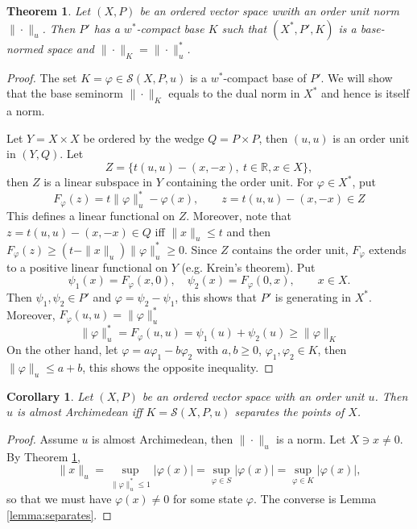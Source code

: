\documentclass[12pt]{article}
\newtheorem{thm}{Theorem}
\newtheorem{coro}{Corollary}
\theoremstyle{remark}
\newcommand{\<}{\langle}
\begin{document}
\begin{thm}\label{thm:ou_dual} Let $(X,P)$ be an ordered vector space wwith an order unit norm $\|\cdot\|_u$. Then 
$P'$  has a $w^*$-compact base $K$ such that  $(X^*,P',K)$ is a base-normed space and $\|\cdot\|_K=\|\cdot\|_u^*$. 

\end{thm}


\begin{proof}\cite{ellis} The set $K=\varphi\in \mathcal S(X,P,u)$  is a  $w^*$-compact  base of $P'$. We will show that the base seminorm $\|\cdot\|_K$ equals to the dual norm in $X^*$ and hence is itself a norm.

Let $Y=X\times X$ be ordered by the wedge $Q=P\times P$, then $(u,u)$ is an order unit in $(Y,Q)$.
Let 
\[
Z=\{t(u,u)-(x,-x),\ t\in \mathbb R, x\in X\},
\]
then $Z$ is a linear subspace in $Y$ containing the order unit. 
For  $\varphi\in X^*$,  put 
\[
F_\varphi(z)=t\|\varphi\|_u^*-\varphi(x), \qquad z=t(u,u)-(x,-x)\in Z
\]
This defines a linear functional on $Z$. Moreover, note that $z=t(u,u)-(x,-x)\in Q$ iff $\|x\|_u\le t$ and then $F_\varphi(z)\ge (t-\|x\|_u)\|\varphi\|_u^*\ge 0$.
Since $Z$ contains the order unit, $F_\varphi$ extends to a positive linear functional on $Y$ (e.g. Krein's theorem). Put 
\[
\psi_1(x)=F_\varphi(x,0),\quad \psi_2(x)=F_\varphi(0,x),\qquad x\in X.
\]
Then $\psi_1,\psi_2\in P'$ and $\varphi=\psi_2-\psi_1$, this shows that $P'$ is generating in $X^*$. Moreover, $F_\varphi(u,u)=\|\varphi\|_u^*$
\[
\|\varphi\|_u^*=F_\varphi(u,u)= \psi_1(u)+\psi_2(u)\ge \|\varphi\|_K
\]
On the other hand, let $\varphi=a\varphi_1- b\varphi_2$ with $a,b\ge 0$, $\varphi_1,\varphi_2\in K$, then
$\|\varphi\|_u\le a+b$, this shows the opposite inequality.

\end{proof}


\begin{coro} Let $(X,P)$ be an ordered vector space with an order unit $u$. Then $u$ is almost Archimedean iff $K=\mathcal S(X,P,u)$ separates the points of $X$.

\end{coro}

\begin{proof} Assume $u$ is almost Archimedean, then $\|\cdot\|_u$ is a norm. Let $X\ni x\ne 0$. By Theorem \ref{thm:ou_dual},
\[
\|x\|_u=\sup_{\|\varphi\|_u^*\le 1} |\varphi(x)|=\sup_{\varphi\in S} |\varphi(x)|=\sup_{\varphi\in K}|\varphi(x)|,
\]
so that we must have $\varphi(x)\ne 0$ for some state $\varphi$. The converse is Lemma \ref{lemma:separates}.

\end{proof}
\end{document}
